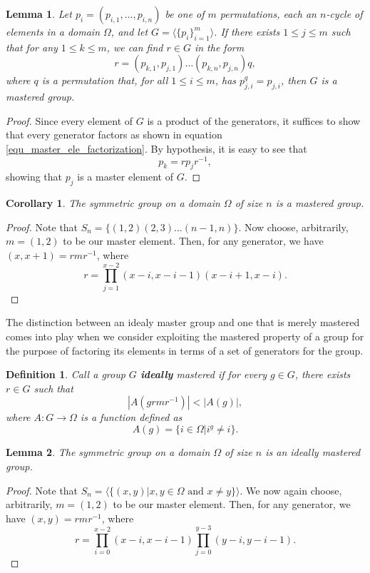 \documentclass[12pt]{article}
\newtheorem{definition}{Definition}[section]
\newtheorem{corollary}{Corollary}[section]
\newtheorem{lemma}{Lemma}[section]
\begin{document}
\begin{lemma}
Let $p_i=(p_{i,1},\dots,p_{i,n})$ be one of $m$ permutations, each an $n$-cycle
of elements in a domain $\Omega$,
and let $G=\langle\{p_i\}_{i=1}^m\rangle$.
If there exists $1\leq j\leq m$ such that for any $1\leq k\leq m$,
we can find $r\in G$ in the form
\begin{equation*}
r = (p_{k,1},p_{j,1})\dots(p_{k,n},p_{j,n})q,
\end{equation*}
where $q$ is a permutation that, for all $1\leq i\leq m$, has $p_{j,i}^q=p_{j,i}$,
then $G$ is a mastered group.
\end{lemma}
\begin{proof}
Since every element of $G$ is a product of the generators, it suffices to
show that every generator factors as shown in equation \eqref{equ_master_ele_factorization}.
By hypothesis, it is easy to see that
\begin{equation*}
p_k = rp_jr^{-1},
\end{equation*}
showing that $p_j$ is a master element of $G$.
\end{proof}
\begin{corollary}\label{cor_sym_grp_mastered}
The symmetric group on a domain $\Omega$ of size $n$ is a mastered group.
\end{corollary}
\begin{proof}
Note that $S_n=\{(1,2)(2,3)\dots(n-1,n)\}$.  Now choose, arbitrarily,
$m=(1,2)$ to be our master element.  Then, for any generator,
we have $(x,x+1)=rmr^{-1}$, where
\begin{equation*}
r = \prod_{j=1}^{x-2}(x-i,x-i-1)(x-i+1,x-i).
\end{equation*}
\end{proof}
The distinction between an idealy master group and one that is merely mastered comes
into play when we consider exploiting the mastered property of a group for the
purpose of factoring its elements in terms of a set of generators for the group.
\begin{definition}
Call a group $G$ \textbf{ideally} mastered if for every $g\in G$, there
exists $r\in G$ such that
\begin{equation*}
|A(grmr^{-1})|<|A(g)|,
\end{equation*}
where $A:G\to\Omega$ is a function defined as
\begin{equation*}
A(g) = \{i\in\Omega|i^g\neq i\}.
\end{equation*}
\end{definition}
\begin{lemma}\label{lem_sym_grp_ideally_mastered}
The symmetric group on a domain $\Omega$ of size $n$ is an ideally mastered group.
\end{lemma}
\begin{proof}
Note that $S_n=\langle\{(x,y)|\mbox{$x,y\in\Omega$ and $x\neq y$}\}\rangle$.  We now again choose,
arbitrarily, $m=(1,2)$ to be our master element.  Then, for any generator, we have
$(x,y)=rmr^{-1}$, where
\begin{equation*}
r = \prod_{i=0}^{x-2}(x-i,x-i-1)\prod_{j=0}^{y-3}(y-i,y-i-1).
\end{equation*}
\end{proof}
\end{document}
